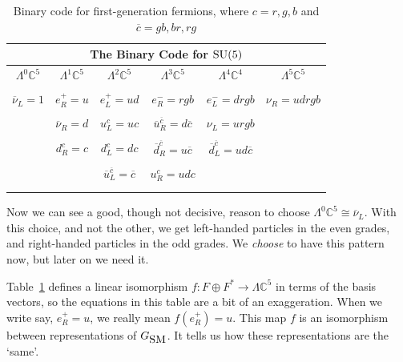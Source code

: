 \documentclass{article}
\newcommand{\maps}{\colon}    %
\newcommand{\C}{{\mathbb C}}  %
\newcommand{\SU}{{\rm SU}}    %
\newcommand{\Ex}{\Lambda} %
\newcommand{\iso}{\cong} %
\newcommand{\GSM}{{G_{\mbox{\rm SM}}}}  %
\newcommand{\ubar}{\overline{u}} %
\newcommand{\dbar}{\overline{d}} %
\newcommand{\nubar}{\overline{\nu}} %
\newcommand{\cbar}{{\overline{c}}} %
\begin{document}
	\begin{table}[H]
\begin{center} 
	\begin{tabular}{cccccc} 
		\hline
		\multicolumn{6}{|c|}{\bf{The Binary Code for \boldmath $\SU(5)$}} \\
		\hline
		$\Ex^0 \C^5$   & $\Ex^1 \C^5$    & $\Ex^2 \C^5$            & $\Ex^3 \C^5$             & $\Ex^4 \C^4$              & $\Ex^5 \C^5$ \\ 
		\hline
\\
		$\nubar_L = 1$ & $e^+_R = u$     & $e^+_L = ud$            & $e^-_R = rgb$            & $e^-_L = drgb$            & $\nu_R = udrgb$ \\  \\
		               & $\nubar_R = d$  & $u^c_L = uc$            & $\ubar^\cbar_R = d\cbar$ & $\nu_L = urgb$            & \\  \\
			       & $d^c_R = c$     & $d^c_L = dc$            & $\dbar^\cbar_R = u\cbar$ & $\dbar^\cbar_L = ud\cbar$ & \\   \\
			       &                 & $\ubar^\cbar_L = \cbar$ & $u^c_R = udc$            &                           & \\   \\
		\hline
	\vspace{-10pt}
	\end{tabular}
		\caption{Binary code for first-generation fermions, where
      $c= r, g, b$ and $\cbar = gb, br, rg$} \label{tab:su5code}
\end{center}
\end{table}
\vspace{-1em}

Now we can see a good, though not decisive, reason to choose $\Ex^0 \C^5 \iso
\nubar_L$. With this choice, and not the other, we get left-handed particles in
the even grades, and right-handed particles in the odd grades. We \emph{choose}
to have this pattern now, but later on we need it.

Table~\ref{tab:su5code} defines a linear isomorphism $f \maps F \oplus F^* \to
\Ex \C^5$ in terms of the basis vectors, so the equations in this table
are a bit of an exaggeration.  When we write say, $e^+_R = u$, we really
mean $f(e^+_R) = u$.  This map $f$ is an isomorphism between 
representations of $\GSM$. It tells us how these representations are 
the `same'.
\end{document}
